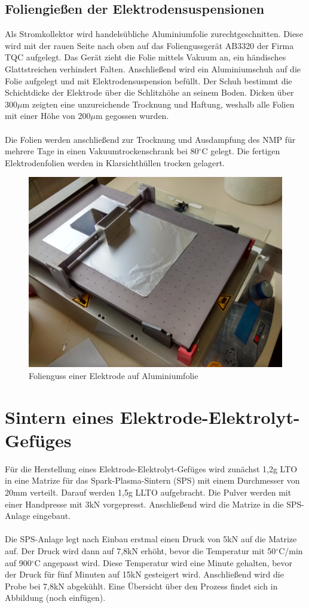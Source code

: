 \documentclass[a4paper, 11pt, headsepline,footsepline,twoside,abstract]{scrbook}
\begin{document}
\subsection{Foliengießen der Elektrodensuspensionen}
Als Stromkollektor wird handelsübliche Aluminiumfolie zurechtgeschnitten. Diese wird mit der rauen Seite nach oben auf das Foliengussgerät AB3320 der Firma TQC aufgelegt. Das Gerät zieht die Folie mittels Vakuum an, ein händisches Glattstreichen verhindert Falten. Anschließend wird ein Aluminiumschuh auf die Folie aufgelegt und mit Elektrodensuspension befüllt. Der Schuh bestimmt die Schichtdicke der Elektrode über die Schlitzhöhe an seinem Boden. Dicken über 300$\mu$m zeigten eine unzureichende Trocknung und Haftung, weshalb alle Folien mit einer Höhe von 200$\mu$m gegossen wurden.
\\\\
Die Folien werden anschließend zur Trocknung und Ausdampfung des NMP für mehrere Tage in einen Vakuumtrockenschrank bei 80$^\circ$C gelegt. Die fertigen Elektrodenfolien werden in Klarsichthüllen trocken gelagert.
\begin{figure}
	\centering
	\includegraphics[width=0.85\columnwidth]{images/folienguss.jpg}
	\caption{Folienguss einer Elektrode auf Aluminiumfolie}
	\label{folienguss}
\end{figure}
\section{Sintern eines Elektrode-Elektrolyt-Gefüges}
Für die Herstellung eines Elektrode-Elektrolyt-Gefüges wird zunächst 1,2g LTO in eine Matrize für das Spark-Plasma-Sintern (SPS) mit einem Durchmesser von 20mm verteilt. Darauf werden 1,5g LLTO aufgebracht. Die Pulver werden mit einer Handpresse mit 3kN vorgepresst. Anschließend wird die Matrize in die SPS-Anlage eingebaut. 
\\\\
Die SPS-Anlage legt nach Einbau erstmal einen Druck von 5kN auf die Matrize auf. Der Druck wird dann auf 7,8kN erhöht, bevor die Temperatur mit 50$^\circ$C/min auf 900$^\circ$C angepasst wird. Diese Temperatur wird eine Minute gehalten, bevor der Druck für fünf Minuten auf 15kN gesteigert wird. Anschließend wird die Probe bei 7,8kN abgekühlt. Eine Übersicht über den Prozess findet sich in Abbildung (noch einfügen).
\end{document}
